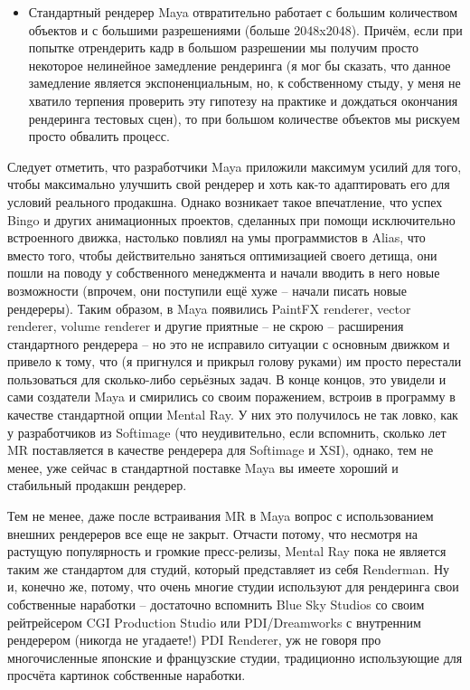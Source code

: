 \begin{itemize}
\item      Стандартный рендерер Maya отвратительно
   работает с большим количеством объектов и с большими разрешениями
   (больше 2048x2048). Причём,
   если при попытке отрендерить кадр в большом разрешении мы получим
   просто некоторое нелинейное замедление рендеринга (я мог бы
   сказать, что данное замедление является экспоненциальным, но, к
   собственному стыду, у меня не хватило терпения проверить эту
   гипотезу на практике и дождаться окончания рендеринга тестовых
   сцен), то при большом количестве объектов мы рискуем просто
   обвалить процесс.
 
\end{itemize}

Следует отметить, что разработчики Maya приложили максимум усилий для того, чтобы максимально улучшить
   свой рендерер и хоть как-то адаптировать его для условий реального
   продакшна. Однако возникает такое впечатление, что успех Bingo и других анимационных проектов, сделанных при помощи
   исключительно встроенного движка, настолько повлиял на умы
   программистов в Alias, что вместо
   того, чтобы действительно заняться оптимизацией своего детища, они
   пошли на поводу у собственного менеджмента и начали вводить в него
   новые возможности (впрочем, они поступили ещё хуже – начали писать
   новые рендереры). Таким образом, в Maya появились PaintFX renderer, vector renderer, volume renderer и другие
   приятные – не скрою – расширения стандартного рендерера – но это не
   исправило ситуации с основным движком и привело к тому, что (я
   пригнулся и прикрыл голову руками) им просто перестали пользоваться
   для сколько-либо серьёзных задач. В конце концов, это увидели и
   сами создатели Maya и смирились
   со своим поражением, встроив в программу в качестве стандартной
   опции Mental Ray. У
   них это получилось не так ловко, как у разработчиков из Softimage (что неудивительно, если вспомнить, сколько лет MR поставляется в качестве рендерера для Softimage и XSI), однако, тем
   не менее, уже сейчас в стандартной поставке Maya вы имеете
   хороший и стабильный продакшн рендерер.
 

Тем не менее, даже после встраивания MR в Maya вопрос с использованием внешних рендереров все еще
   не закрыт. Отчасти потому, что несмотря на растущую популярность и
   громкие пресс-релизы, Mental Ray пока не
   является таким же стандартом для студий, который представляет из
   себя Renderman. Ну и,
   конечно же, потому, что очень многие студии используют для
   рендеринга свои собственные наработки – достаточно вспомнить Blue Sky Studios со своим
   рейтрейсером CGI Production Studio или PDI/Dreamworks с
   внутренним рендерером (никогда не угадаете!) PDI Renderer, уж не
   говоря про многочисленные японские и французские студии,
   традиционно использующие для просчёта картинок собственные
   наработки.
 

